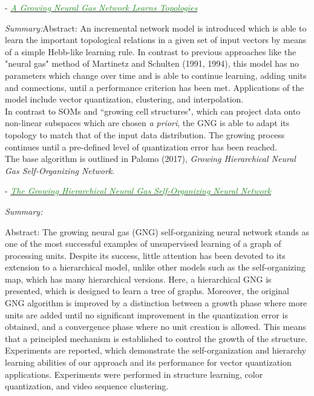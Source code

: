 \documentclass[]{article}
\newcommand{\paperentry}[4]{
            \hangindent=1cm
            \cite{#1} - \href{run:../References/#3}{\textcolor{ForestGreen}{\textit{#2}}}
            
            \noindent            
            \begin{minipage}[t]{0.1\linewidth}\hfill\end{minipage}
            \begin{minipage}[t]{0.8\linewidth}\textcolor{NavyBlue}{{\textit{Summary:}}}#4\end{minipage}
            \vspace{.25cm}
          }
\begin{document}
	\paperentry{Fritzke1995GrowingNeuralGas}
	{A Growing Neural Gas Network Learns Topologies}
	{Manifold_Representation_Learning/CHL/Fritzke1995GrowingNeuralGas.pdf}
	{Abstract: An incremental network model is introduced which is able to learn the important topological relations in a given set of input vectors by means of a simple Hebb-like learning rule. In contrast to previous approaches like the "neural gas" method of Martinetz and Schulten (1991, 1994), this model has no parameters which change over time and is able to continue learning, adding units and connections, until a performance criterion has been met. Applications of the model include vector quantization, clustering, and interpolation. \\
		
	\noindent
	In contrast to SOMs and ``growing cell structures", which can project data onto non-linear subspaces which are chosen \textit{a priori}, the GNG is able to adapt its topology to match that of the input data distribution.  The growing process continues until a pre-defined level of quantization error has been reached. \\
	
	\noindent
	The base algorithm is outlined in Palomo (2017), \textit{Growing Hierarchical Neural Gas Self-Organizing Network}.		
	}
	
	\paperentry{Palomo2017GHNG}
	{The Growing Hierarchical Neural Gas Self-Organizing Neural Network}
	{Manifold_Representation_Learning/CHL/Palomo2017GHNG.pdf}
	{}
	\newline
	Abstract: The growing neural gas (GNG) self-organizing neural network stands as one of the most successful examples of unsupervised learning of a graph of processing units. Despite its success, little attention has been devoted to its extension to a hierarchical model, unlike other models such as the self-organizing	map, which has many hierarchical versions. Here, a hierarchical GNG is presented, which is designed to learn a tree of graphs.  Moreover, the original GNG algorithm is improved by a distinction between a growth phase where more units are added until no significant improvement in the quantization error is obtained, and a convergence phase where no unit creation is	allowed. This means that a principled mechanism is established	to control the growth of the structure. Experiments are reported, which demonstrate the self-organization and hierarchy learning abilities of our approach and its performance for vector quantization	applications.  Experiments were performed in structure learning, color quantization, and video sequence clustering. \\
		
\end{document}
